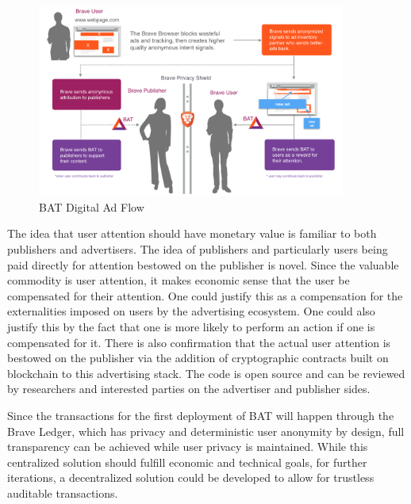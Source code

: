 \documentclass[11pt]{article}
\begin{document}
\begin{figure}
\begin{center}
\includegraphics[width=0.9\textwidth]{BAT_digital_ad_flow.png}
\caption{BAT Digital Ad Flow}
\end{center}
\end{figure}



The idea that user attention should have monetary value is familiar to
both publishers and advertisers. The idea of publishers and
particularly users being paid directly for attention bestowed on the
publisher is novel. Since the valuable commodity is user attention, it
makes economic sense that the user be compensated for their
attention. One could justify this as a compensation for the
externalities imposed on users by the advertising ecosystem. One could
also justify this by the fact that one is more likely to perform an
action if one is compensated for it. There is also confirmation that
the actual user attention is bestowed on the publisher via the
addition of cryptographic contracts built on blockchain to this
advertising stack. The code is open source and can be reviewed by
researchers and interested parties on the advertiser and publisher sides.

Since the transactions for the first deployment of BAT will happen
through the Brave Ledger, which has privacy and deterministic user
anonymity by design, full transparency can be achieved while user privacy is maintained. While this 
centralized solution should fulfill economic and technical goals, for further iterations, a 
decentralized solution could be developed to allow for trustless
auditable transactions.
\end{document}

